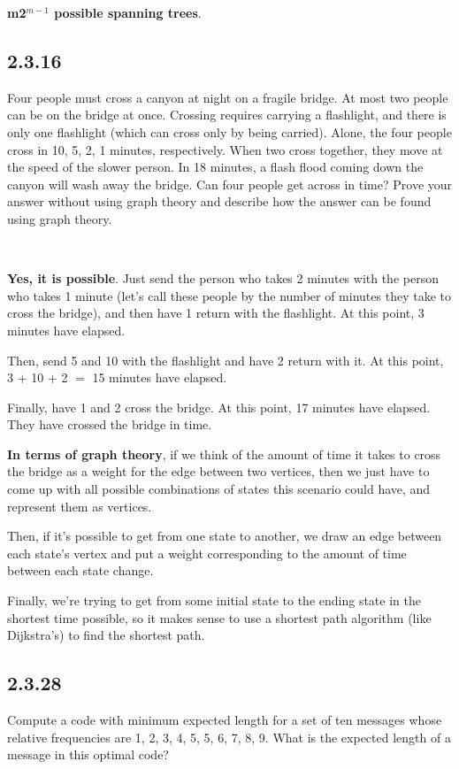 \documentclass{article}
\newcommand{\mt}[1]{\ensuremath{#1}}
\newcommand\ssc[2][\DefaultOpt]{%
  \def\DefaultOpt{#2}%
  \subsection[#1]{#2}%
}
\newcommand{\ps}{\mt{\operatorname{+}} }
\newcommand{\eql}{ \mt{\operatorname{=}} }
\newcommand{\uf}[2]{#1\mt{^{#2}}}
\begin{document}
{{\textbf{m\uf{2}{m - 1} possible spanning trees}.

}
\ssc{2.3.16}{

Four people must cross a canyon at night on a fragile bridge. At most two people can be on the bridge at once. Crossing requires carrying a flashlight, and there is only one flashlight (which can cross only by being carried). Alone, the four people cross in 10, 5, 2, 1 minutes, respectively. When two cross together, they move at the speed of the slower person. In 18 minutes, a flash flood coming down the canyon will wash away the bridge. Can four people get across in time? Prove your answer without using graph theory and describe how the answer can be found using graph theory.

\

\textbf{Yes, it is possible}. Just send the person who takes 2 minutes with the person who takes 1 minute (let's call these people by the number of minutes they take to cross the bridge), and then have 1 return with the flashlight. At this point, 3 minutes have elapsed.

Then, send 5 and 10 with the flashlight and have 2 return with it. At this point, 3 \ps 10 \ps 2 \eql 15 minutes have elapsed.

Finally, have 1 and 2 cross the bridge. At this point, 17 minutes have elapsed. They have crossed the bridge in time.

\textbf{In terms of graph theory}, if we think of the amount of time it takes to cross the bridge as a weight for the edge between two vertices, then we just have to come up with all possible combinations of states this scenario could have, and represent them as vertices. 

Then, if it's possible to get from one state to another, we draw an edge between each state's vertex and put a weight corresponding to the amount of time between each state change.

Finally, we're trying to get from some initial state to the ending state in the shortest time possible, so it makes sense to use a shortest path algorithm (like Dijkstra's) to find the shortest path.



}

\newpage 

\ssc{2.3.28}{

Compute a code with minimum expected length for a set of ten messages whose relative frequencies are 1, 2, 3, 4, 5, 5, 6, 7, 8, 9. What is the expected length of a message in this optimal code?

}}
\end{document}
